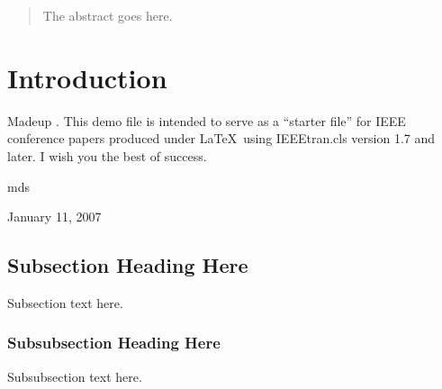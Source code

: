 \documentclass[conference,10pt]{IEEEtran}
\begin{document}




\maketitle


\begin{abstract}
The abstract goes here.
\end{abstract}





%
\IEEEpeerreviewmaketitle



\section{Introduction}
Madeup \cite{hoard}.
This demo file is intended to serve as a ``starter file''
for IEEE conference papers produced under \LaTeX\ using
IEEEtran.cls version 1.7 and later.
I wish you the best of success.

\hfill mds
 
\hfill January 11, 2007

\subsection{Subsection Heading Here}
Subsection text here.


\subsubsection{Subsubsection Heading Here}
Subsubsection text here.
\end{document}
